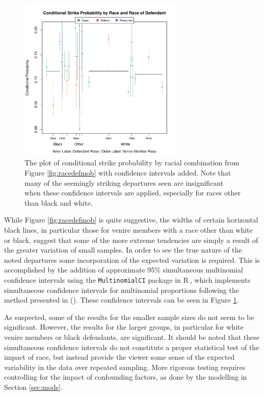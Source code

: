 \documentclass[12pt]{article}
\newcommand*{\R}{\textsf{R}$~$}
\begin{document}
\begin{figure}[h!]
  \centering
  \includegraphics[width=0.7\textwidth]{RaceDefCI}
  \caption[Strikes by Racial Combination with Confidence
  Intervals (Sunsine)]{\footnotesize The plot of conditional strike probability by racial
    combination from Figure \ref{fig:racedefmob} with confidence intervals added. Note that many of the seemingly striking departures seen are
    insignificant when these confidence intervals are applied,
    especially for races other than black and white.}
  \label{fig:racedefci}
\end{figure}

While Figure \ref{fig:racedefmob} is quite suggestive, the widths of certain horizontal black lines, in particular those for venire members with a race other than white or black, suggest that some of the more extreme tendencies are simply a result of the greater variation of small samples. In order to see the true nature of the noted departures some incorporation of the expected variation is required. This is accomplished by the addition of approximate 95\% simultaneous multinomial confidence intervals using the \texttt{MultinomialCI} package in \R, which implements simultaneous confidence intervals for multinomial proportions following the method presented in (\cite{sison1995}). These confidence intervals can be seen in Figure \ref{fig:racedefci}.

As suspected, some of the results for the smaller sample sizes do not seem to be significant. However, the results for the larger groups, in particular for white venire members or black defendants, are significant. It should be noted that these simultaneous confidence intervals do not constitute a proper statistical test of the impact of race, but instead provide the viewer some sense of the expected variability in the data over repeated sampling. More rigorous testing requires controlling for the impact of confounding factors, as done by the modelling in Section \ref{sec:mods}.
\end{document}
